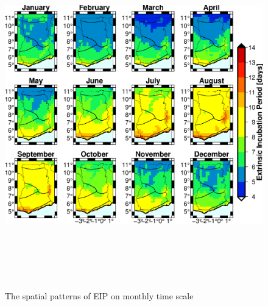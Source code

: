 \documentclass[utf8]{FrontiersinHarvard} %
\begin{document}
\begin{figure}[ht]
\begin{center}
\includegraphics[width=15cm,height=15cm]{eip_era5.eps}
\caption{The spatial patterns of EIP on monthly time scale}
\label{fig:3:2}
\end{center}
\end{figure}
\end{document}
